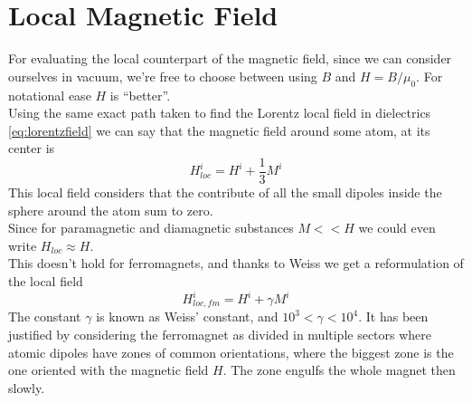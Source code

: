 \documentclass[../electromagnetism.tex]{subfiles}
\begin{document}
\section{Local Magnetic Field}
For evaluating the local counterpart of the magnetic field, since we can consider ourselves in vacuum, we're free to choose between using $B$ and $H=B/\mu_0$. For notational ease $H$ is ``better''.\\
Using the same exact path taken to find the Lorentz local field in dielectrics \eqref{eq:lorentzfield} we can say that the magnetic field around some atom, at its center is
\begin{equation}
	H^i_{loc}=H^i+\frac{1}{3}M^i
	\label{eq:localmagneticfield}
\end{equation}
This local field considers that the contribute of all the small dipoles inside the sphere around the atom sum to zero.\\
Since for paramagnetic and diamagnetic substances $M<<H$ we could even write $H_{loc}\approx H$.\\
This doesn't hold for ferromagnets, and thanks to Weiss we get a reformulation of the local field
\begin{equation}
	H^i_{loc,fm}=H^i+\gamma M^i
	\label{eq:weisslawfmag}
\end{equation}
The constant $\gamma$ is known as Weiss' constant, and $10^3<\gamma<10^4$. It has been justified by considering the ferromagnet as divided in multiple sectors where atomic dipoles have zones of common orientations, where the biggest zone is the one oriented with the magnetic field $H$. The zone engulfs the whole magnet then slowly.\\
\end{document}
